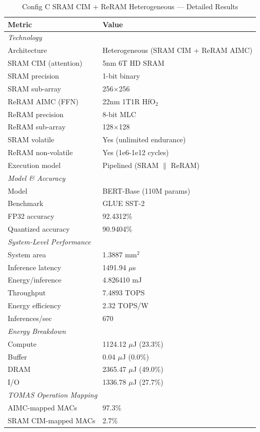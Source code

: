 \begin{table}[htbp]
\centering
\caption{Config C SRAM CIM + ReRAM Heterogeneous --- Detailed Results}
\label{tab:config_c_detail}
\begin{tabular}{ll}
\toprule
\textbf{Metric} & \textbf{Value} \\
\midrule
\multicolumn{2}{l}{\textit{Technology}} \\
\quad Architecture & Heterogeneous (SRAM CIM + ReRAM AIMC) \\
\quad SRAM CIM (attention) & 5nm 6T HD SRAM \\
\quad SRAM precision & 1-bit binary \\
\quad SRAM sub-array & 256$\times$256 \\
\quad ReRAM AIMC (FFN) & 22nm 1T1R HfO$_2$ \\
\quad ReRAM precision & 8-bit MLC \\
\quad ReRAM sub-array & 128$\times$128 \\
\quad SRAM volatile & Yes (unlimited endurance) \\
\quad ReRAM non-volatile & Yes (1e6-1e12 cycles) \\
\quad Execution model & Pipelined (SRAM $\|$ ReRAM) \\
\midrule
\multicolumn{2}{l}{\textit{Model \& Accuracy}} \\
\quad Model & BERT-Base (110M params) \\
\quad Benchmark & GLUE SST-2 \\
\quad FP32 accuracy & 92.4312\% \\
\quad Quantized accuracy & 90.9404\% \\
\midrule
\multicolumn{2}{l}{\textit{System-Level Performance}} \\
\quad System area & 1.3887 mm$^2$ \\
\quad Inference latency & 1491.94 $\mu$s \\
\quad Energy/inference & 4.826410 mJ \\
\quad Throughput & 7.4893 TOPS \\
\quad Energy efficiency & 2.32 TOPS/W \\
\quad Inferences/sec & 670 \\
\midrule
\multicolumn{2}{l}{\textit{Energy Breakdown}} \\
\quad Compute & 1124.12 $\mu$J (23.3\%) \\
\quad Buffer & 0.04 $\mu$J (0.0\%) \\
\quad DRAM & 2365.47 $\mu$J (49.0\%) \\
\quad I/O & 1336.78 $\mu$J (27.7\%) \\
\midrule
\multicolumn{2}{l}{\textit{TOMAS Operation Mapping}} \\
\quad AIMC-mapped MACs & 97.3\% \\
\quad SRAM CIM-mapped MACs & 2.7\% \\
\bottomrule
\end{tabular}
\end{table}
